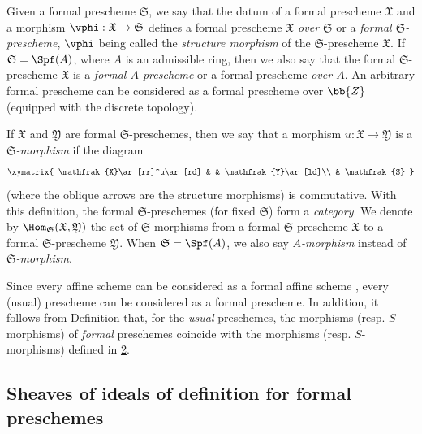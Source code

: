 \begin{env}[10.4.7]
\label{I.10.4.7}
Given a formal prescheme $\mathfrak{S}$, we say that the datum of a formal prescheme $\mathfrak{X}$ and a morphism $\vphi:\mathfrak{X}\to\mathfrak{S}$ defines a formal prescheme \emph{$\mathfrak{X}$ over $\mathfrak{S}$} or a \emph{formal $\mathfrak{S}$-prescheme}, $\vphi$ being called the \emph{structure morphism} of the $\mathfrak{S}$-prescheme $\mathfrak{X}$.
If $\mathfrak{S}=\Spf(A)$, where $A$ is an admissible ring, then we also say that the formal $\mathfrak{S}$-prescheme $\mathfrak{X}$ is a \emph{formal $A$-prescheme} or a formal prescheme \emph{over $A$}.
An arbitrary formal prescheme can be considered as a formal prescheme over $\bb{Z}$ (equipped with the discrete topology).

If $\mathfrak{X}$ and $\mathfrak{Y}$ are formal $\mathfrak{S}$-preschemes, then we say that a morphism $u:\mathfrak{X}\to\mathfrak{Y}$ is a \emph{$\mathfrak{S}$-morphism} if the diagram
\[
  \xymatrix{
    \mathfrak{X}\ar[rr]^u\ar[rd] & &
    \mathfrak{Y}\ar[ld]\\
    & \mathfrak{S}
  }
\]
(where the oblique arrows are the structure morphisms) is commutative.
With this definition, the formal $\mathfrak{S}$-preschemes (for fixed $\mathfrak{S}$) form a \emph{category}.
We denote by $\Hom_\mathfrak{S}(\mathfrak{X},\mathfrak{Y})$ the set of $\mathfrak{S}$-morphisms from a formal $\mathfrak{S}$-prescheme $\mathfrak{X}$ to a formal $\mathfrak{S}$-prescheme $\mathfrak{Y}$.
When $\mathfrak{S}=\Spf(A)$, we also say \emph{$A$-morphism} instead of \emph{$\mathfrak{S}$-morphism}.
\end{env}

\begin{env}[10.4.8]
\label{I.10.4.8}
Since every affine scheme can be considered as a formal affine scheme , every (usual) prescheme can be considered as a formal prescheme.
In addition, it follows from Definition  that, for the \emph{usual} preschemes, the morphisms (resp. $S$-morphisms) of \emph{formal} preschemes coincide with the morphisms (resp. $S$-morphisms) defined in \textsection\hyperref[section:I.2]{2}.
\end{env}

\subsection{Sheaves of ideals of definition for formal preschemes}
\label{subsection:I.10.5}

